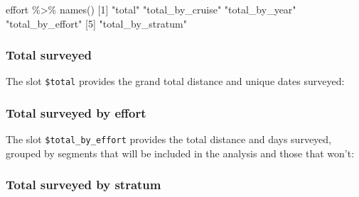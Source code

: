 \documentclass[
]{book}
\newenvironment{Shaded}{\begin{snugshade}}{\end{snugshade}}
\newcommand{\AttributeTok}[1]{\textcolor[rgb]{0.77,0.63,0.00}{#1}}
\newcommand{\DecValTok}[1]{\textcolor[rgb]{0.00,0.00,0.81}{#1}}
\newcommand{\FunctionTok}[1]{\textcolor[rgb]{0.00,0.00,0.00}{#1}}
\newcommand{\NormalTok}[1]{#1}
\newcommand{\SpecialCharTok}[1]{\textcolor[rgb]{0.00,0.00,0.00}{#1}}
\newcommand{\StringTok}[1]{\textcolor[rgb]{0.31,0.60,0.02}{#1}}
\begin{document}
\begin{Shaded}
\begin{Highlighting}[]
\NormalTok{effort }\SpecialCharTok{\%\textgreater{}\%}  \FunctionTok{names}\NormalTok{()}
\NormalTok{[}\DecValTok{1}\NormalTok{] }\StringTok{"total"}            \StringTok{"total\_by\_cruise"}  \StringTok{"total\_by\_year"}    \StringTok{"total\_by\_effort"} 
\NormalTok{[}\DecValTok{5}\NormalTok{] }\StringTok{"total\_by\_stratum"}
\end{Highlighting}
\end{Shaded}

\hypertarget{total-surveyed}{%
\subsubsection*{Total surveyed}\label{total-surveyed}}

The slot \texttt{\$total} provides the grand total distance and unique dates surveyed:

\begin{Shaded}
\end{Shaded}

\hypertarget{total-surveyed-by-effort}{%
\subsubsection*{Total surveyed by effort}\label{total-surveyed-by-effort}}

The slot \texttt{\$total\_by\_effort} provides the total distance and days surveyed, grouped by segments that will be included in the analysis and those that won't:

\hypertarget{total-surveyed-by-stratum}{%
\subsubsection*{Total surveyed by stratum}\label{total-surveyed-by-stratum}}
\end{document}
